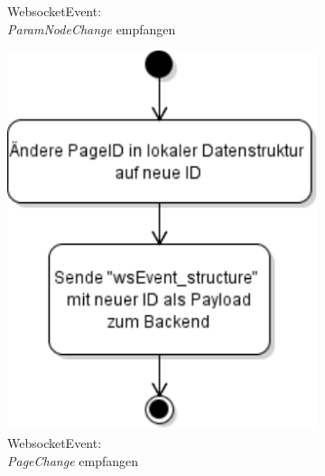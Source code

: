 \begin{figure}[ht]
\begin{subfigure}[b]{0.48\textwidth}
      \caption{WebsocketEvent:\\\emph{ParamNodeChange} empfangen}
      \label{fig:aDDF:wsEvent_paramNodeChange}
  \end{subfigure}
  \hspace{50.00mm}

  \begin{subfigure}[b]{0.3\textwidth}
      \centering
      \includegraphics[width=\textwidth]{content/hauptteil/systemEntwurf/res/wsHandler/frontend/wsEvent_pageChange.pdf}
      \caption{WebsocketEvent:\\\emph{PageChange} empfangen}
      \label{fig:aDDF:wsEvent_pageChange}
  \end{subfigure}
  \hfill
  \begin{subfigure}[b]{0.38\textwidth}
      \centering

\end{subfigure}
\end{figure}

